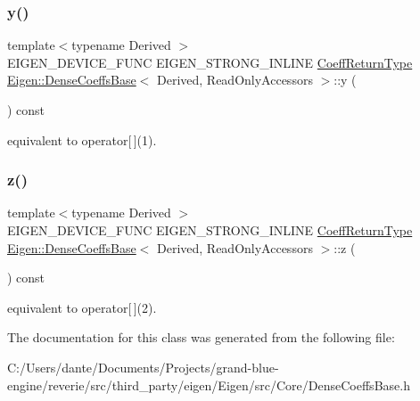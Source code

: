 \subsubsection{\texorpdfstring{y()}{y()}}
{\footnotesize\ttfamily template$<$typename Derived $>$ \\
E\+I\+G\+E\+N\+\_\+\+D\+E\+V\+I\+C\+E\+\_\+\+F\+U\+NC E\+I\+G\+E\+N\+\_\+\+S\+T\+R\+O\+N\+G\+\_\+\+I\+N\+L\+I\+NE \mbox{\hyperlink{struct_eigen_1_1internal_1_1true__type}{Coeff\+Return\+Type}} \mbox{\hyperlink{class_eigen_1_1_dense_coeffs_base}{Eigen\+::\+Dense\+Coeffs\+Base}}$<$ Derived, Read\+Only\+Accessors $>$\+::y (\begin{DoxyParamCaption}{ }\end{DoxyParamCaption}) const\hspace{0.3cm}{\ttfamily [inline]}}

equivalent to operator\mbox{[}$\,$\mbox{]}(1). \mbox{\label{class_eigen_1_1_dense_coeffs_base_3_01_derived_00_01_read_only_accessors_01_4_a9040af2dcad8961168daafe09c1b1dc4}} 
\subsubsection{\texorpdfstring{z()}{z()}}
{\footnotesize\ttfamily template$<$typename Derived $>$ \\
E\+I\+G\+E\+N\+\_\+\+D\+E\+V\+I\+C\+E\+\_\+\+F\+U\+NC E\+I\+G\+E\+N\+\_\+\+S\+T\+R\+O\+N\+G\+\_\+\+I\+N\+L\+I\+NE \mbox{\hyperlink{struct_eigen_1_1internal_1_1true__type}{Coeff\+Return\+Type}} \mbox{\hyperlink{class_eigen_1_1_dense_coeffs_base}{Eigen\+::\+Dense\+Coeffs\+Base}}$<$ Derived, Read\+Only\+Accessors $>$\+::z (\begin{DoxyParamCaption}{ }\end{DoxyParamCaption}) const\hspace{0.3cm}{\ttfamily [inline]}}

equivalent to operator\mbox{[}$\,$\mbox{]}(2). 

The documentation for this class was generated from the following file\+:\begin{DoxyCompactItemize}
\item 
C\+:/\+Users/dante/\+Documents/\+Projects/grand-\/blue-\/engine/reverie/src/third\+\_\+party/eigen/\+Eigen/src/\+Core/Dense\+Coeffs\+Base.\+h\end{DoxyCompactItemize}
